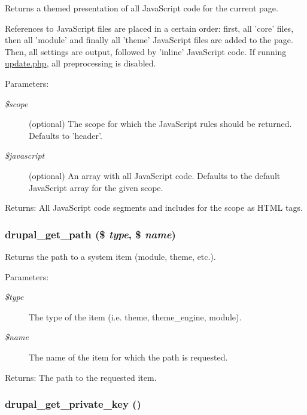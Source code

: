 Returns a themed presentation of all JavaScript code for the current page.

References to JavaScript files are placed in a certain order: first, all 'core' files, then all 'module' and finally all 'theme' JavaScript files are added to the page. Then, all settings are output, followed by 'inline' JavaScript code. If running \hyperlink{update_8php}{update.php}, all preprocessing is disabled.

\begin{Desc}
\item[Parameters:]
\begin{description}
\item[{\em \$scope}](optional) The scope for which the JavaScript rules should be returned. Defaults to 'header'. \item[{\em \$javascript}](optional) An array with all JavaScript code. Defaults to the default JavaScript array for the given scope. \end{description}
\end{Desc}
\begin{Desc}
\item[Returns:]All JavaScript code segments and includes for the scope as HTML tags. \end{Desc}
\hypertarget{common_8inc_e3bbe8f97bf07bb0eaf4580c98f9bf94}{
\subsubsection[{drupal\_\-get\_\-path}]{\setlength{\rightskip}{0pt plus 5cm}drupal\_\-get\_\-path (\$ {\em type}, \/  \$ {\em name})}}
\label{common_8inc_e3bbe8f97bf07bb0eaf4580c98f9bf94}


Returns the path to a system item (module, theme, etc.).

\begin{Desc}
\item[Parameters:]
\begin{description}
\item[{\em \$type}]The type of the item (i.e. theme, theme\_\-engine, module). \item[{\em \$name}]The name of the item for which the path is requested.\end{description}
\end{Desc}
\begin{Desc}
\item[Returns:]The path to the requested item. \end{Desc}
\hypertarget{common_8inc_73373e2d357d0e624c209efe27515af6}{
\subsubsection[{drupal\_\-get\_\-private\_\-key}]{\setlength{\rightskip}{0pt plus 5cm}drupal\_\-get\_\-private\_\-key ()}}
\label{common_8inc_73373e2d357d0e624c209efe27515af6}


